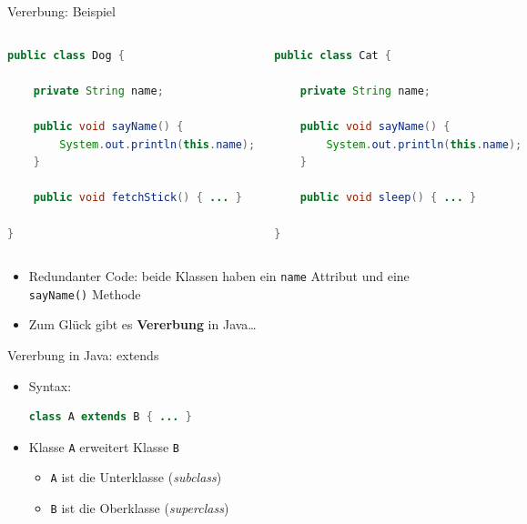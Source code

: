\documentclass[18pt]{beamer}
\begin{document}
\begin{frame}[fragile]{Vererbung: Beispiel}
    \begin{columns}[c]
            \begin{exampleblock}{}
                \begin{lstlisting}[language=Java,basicstyle=\scriptsize]
public class Dog {

    private String name;

    public void sayName() {
        System.out.println(this.name);
    }

    public void fetchStick() { ... }

}
                \end{lstlisting}

            \end{exampleblock}
            \begin{exampleblock}{}
                \begin{lstlisting}[language=Java,basicstyle=\scriptsize]
public class Cat {

    private String name;

    public void sayName() {
        System.out.println(this.name);
    }

    public void sleep() { ... }

}
                \end{lstlisting}
            \end{exampleblock}
    \end{columns}

    \pause

    \begin{itemize}
        \item Redundanter Code: beide Klassen haben ein \texttt{name} Attribut und eine \texttt{sayName()} Methode
        \item Zum Glück gibt es \textbf{Vererbung} in Java\dots
    \end{itemize}
\end{frame}

\begin{frame}[fragile]{Vererbung in Java: extends}
    \begin{itemize}
        \item Syntax:\\
\begin{lstlisting}[language=Java]
class A extends B { ... }
\end{lstlisting}
        \item Klasse \texttt{A} erweitert Klasse \texttt{B}
        \begin{itemize}
            \item \texttt{A} ist die Unterklasse (\textit{subclass})
            \item \texttt{B} ist die Oberklasse (\textit{superclass})
        \end{itemize}


    \end{itemize}
\end{frame}
\end{document}
